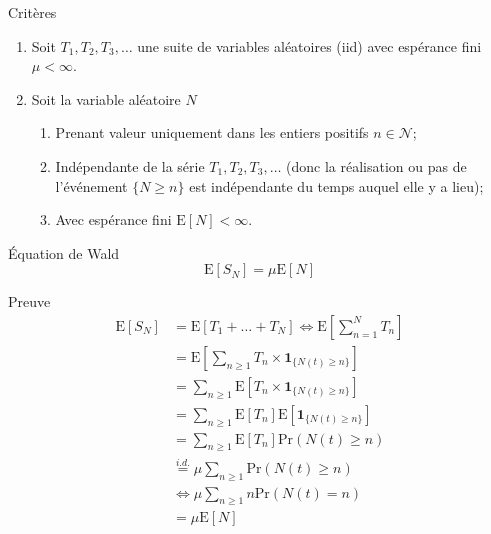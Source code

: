 \begin{crit-ann}{Critères}
\begin{enumerate}
	\item	Soit $T_{1}, T_{2}, T_{3}, \dots$ une suite de variables aléatoires (iid) avec espérance fini $\mu < \infty$.
	\item	Soit la variable aléatoire $N$
	\begin{enumerate}
		\item	Prenant valeur uniquement dans les entiers positifs $n \in \mathcal{N}$;
		\item	Indépendante de la série $T_{1}, T_{2}, T_{3}, \dots$ (donc la réalisation ou pas de l'événement $\{N \geq n\}$ est indépendante du temps auquel elle y a lieu);
		\item Avec espérance fini $\text{E}[N] < \infty$. 
	\end{enumerate}
\end{enumerate}
\end{crit-ann}
\begin{theo-ann}{Équation de Wald}
\begin{equation*}
	\text{E}\left[ S_{N} \right]	
	=	\mu \text{E}[N]
\end{equation*}
\end{theo-ann}
\begin{preuve-ann}{Preuve}
\begin{align*}
	\text{E}\left[ S_{N} \right]
	&=	\text{E}\left[ T_{1} + \dots + T_{N} \right]	
	\Leftrightarrow	\text{E}\left[ \sum_{n = 1}^{N} T_{n} \right]	\\
	&=	\text{E}\left[ \sum_{n \geq 1} T_{n} \times \bm{1}_{\{N(t) \geq n \}} \right]	\\
	&=	\sum_{n \geq 1} \text{E}\left[ T_{n} \times \bm{1}_{\{N(t) \geq n \}} \right]	\\
	&=	\sum_{n \geq 1} \text{E}\left[ T_{n}\right] \text{E}\left[\bm{1}_{\{N(t) \geq n \}} \right]	\\
	&=	\sum_{n \geq 1} \text{E}\left[ T_{n}\right] \text{Pr}\left(N(t) \geq n \right)	\\
	&\overset{i.d.}{=}	\mu \sum_{n \geq 1} \text{Pr}\left(N(t) \geq n \right)	\\
	&\Leftrightarrow 	\mu \sum_{n \geq 1} n \text{Pr}\left(N(t) = n \right)	\\
	&= 	\mu \text{E}[N]	
\end{align*}
\end{preuve-ann}
